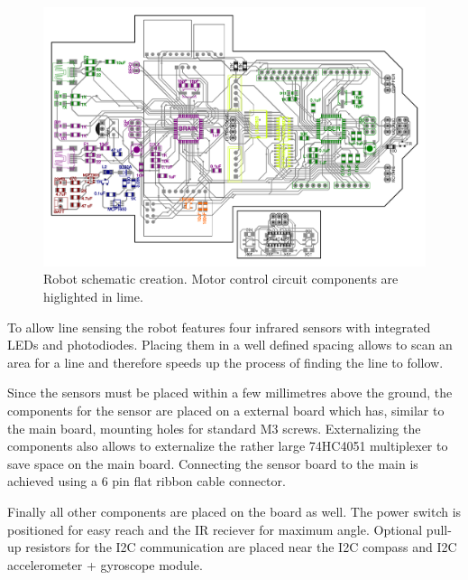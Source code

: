 \begin{figure}[H]
  \centering
  \includegraphics[width=\textwidth]{images/schematic/robot_schematic_motor.pdf}
  \caption{Robot schematic creation. Motor control circuit components are higlighted in lime.}
\end{figure}

To allow line sensing the robot features four infrared sensors with integrated LEDs and photodiodes. Placing them in a well defined spacing allows to scan an area for a line and therefore speeds up the process of finding the line to follow.

Since the sensors must be placed within a few millimetres above the ground, the components for the sensor are placed on a external board which has, similar to the main board, mounting holes for standard M3 screws. Externalizing the components also allows to externalize the rather large 74HC4051 multiplexer to save space on the main board. Connecting the sensor board to the main is achieved using a 6 pin flat ribbon cable connector.

%
%

Finally all other components are placed on the board as well. The power switch is positioned for easy reach and the IR reciever for maximum angle. Optional pull-up resistors for the I2C communication are placed near the I2C compass and I2C accelerometer + gyroscope module. 

